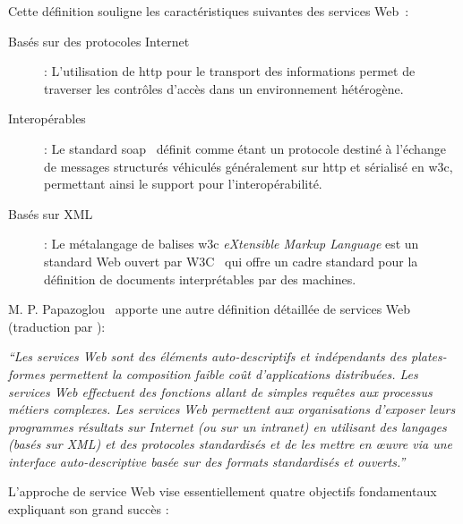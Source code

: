   Cette définition souligne les caractéristiques suivantes des
  services Web~\cite{fremantle2002enterprise}:

  \renewcommand{\descriptionlabel}[1]{\hspace{0.5cm}\textbullet~\textsf{#1}}
  \begin{description}
  \item[Basés sur des protocoles Internet]: L'utilisation de
    \acrshort{http} pour le transport des informations permet de
    traverser les contrôles d'accès dans un environnement hétérogène.

  \item[Interopérables]: Le standard
    \acrshort{soap}~\cite{box2000simple} définit comme étant un
    protocole destiné à l'échange de messages structurés véhiculés
    généralement sur \acrshort{http} et sérialisé en \acrshort{w3c},
    permettant ainsi le support pour l'interopérabilité.

  \item[Basés sur XML]: Le métalangage de balises \acrshort{w3c}
    \textit{eXtensible Markup Language} est un standard Web ouvert par
    \textsc{W3C}~\cite{bray1998extensible} qui offre un cadre standard
    pour la définition de documents interprétables par des machines.
  \end{description}
  \enddescription

  M. P. Papazoglou~\cite{papazoglou2003service} apporte une autre
  définition détaillée de services Web (traduction par
  \cite{driss2011approche}):\bigskip

  \textit{``Les services Web sont des éléments auto-descriptifs et
    indépendants des plates-formes permettent la composition faible
    coût d’applications distribuées. Les services Web effectuent des
    fonctions allant de simples requêtes aux processus métiers
    complexes. Les services Web permettent aux organisations d'exposer
    leurs programmes résultats sur Internet (ou sur un intranet) en
    utilisant des langages (basés sur XML) et des protocoles
    standardisés et de les mettre en œuvre via une interface
    auto-descriptive basée sur des formats standardisés et
    ouverts.''}\bigskip

  L'approche de service Web vise essentiellement quatre objectifs
  fondamentaux expliquant son grand succès \cite{driss2011approche}:

